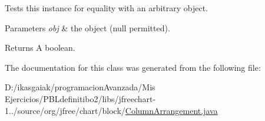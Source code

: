 Tests this instance for equality with an arbitrary object.


\begin{DoxyParams}{Parameters}
{\em obj} & the object ({\ttfamily null} permitted).\\
\hline
\end{DoxyParams}
\begin{DoxyReturn}{Returns}
A boolean. 
\end{DoxyReturn}


The documentation for this class was generated from the following file\+:\begin{DoxyCompactItemize}
\item 
D\+:/ikasgaiak/programacion\+Avanzada/\+Mis Ejercicios/\+P\+B\+Ldefinitibo2/libs/jfreechart-\/1../source/org/jfree/chart/block/\mbox{\hyperlink{_column_arrangement_8java}{Column\+Arrangement.\+java}}\end{DoxyCompactItemize}
